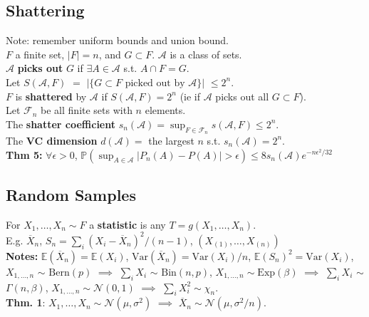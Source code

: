 \documentclass[10pt,twocolumn]{article}
\begin{document}
\subsection*{Shattering}
Note: remember uniform bounds and union bound.\\
$F$ a finite set, $|F| = n$, and $G \subset F$. $\mathcal{A}$ is a class of sets.\\
$\mathcal{A}$ \textbf{picks out} $G$ if $\exists A \in \mathcal{A}$ s.t. $A \cap F = G$.\\
Let $S(\mathcal{A},F)$ $=$ $|\{G \subset F \text{ picked out by } \mathcal{A}\}|$ $\leq 2^{n}$.\\
$F$ is \textbf{shattered} by $\mathcal{A}$ if $S(\mathcal{A},F) = 2^{n}$ (ie if $\mathcal{A}$ picks out all $G \subset F$).\\
Let $\mathcal{F}_{n}$ be all finite sets with $n$ elements.\\
The \textbf{shatter coefficient} $s_{n}(\mathcal{A}) = \sup_{F \in \mathcal{F}_{n}} s(\mathcal{A},F) \leq 2^{n}$.\\
The \textbf{VC dimension} $d(\mathcal{A}) =$ the largest $n$ s.t. $s_{n}(\mathcal{A}) = 2^{n}$.\\
\textbf{Thm 5:} $\forall \epsilon>0$, $\mathbb{P}(\sup_{A \in \mathcal{A}} |P_{n}(A) - P(A)| > \epsilon) \leq 8 s_{n}(\mathcal{A})e^{-n\epsilon^{2}/32}$


\subsection*{Random Samples}
For $X_{1},\ldots,X_{n} \sim F$ a \textbf{statistic} is any $T = g(X_{1},\ldots,X_{n})$.\\
E.g. $\overline{X}_{n}$, $S_{n} = \sum_{i}(X_{i}-\overline{X}_{n})^{2} / (n-1)$, $\left(X_{(1)},\ldots,X_{(n)}\right)$\\
\textbf{Notes:} $\mathbb{E}(\overline{X}_{n}) = \mathbb{E}(X_{i})$, $\text{Var}(\overline{X}_{n}) = \text{Var}(X_{i})/n$, $\mathbb{E}(S_{n})^{2} = \text{Var}(X_{i})$, $X_{1,\ldots,n}$ $\sim$ $\text{Bern}(p)$ $\implies$ $\sum_{i} X_{i}$ $\sim$ $\text{Bin}(n,p)$, $X_{1,\ldots,n} \sim \text{Exp}(\beta)$ $\implies$ $\sum_{i}X_{i}$ $\sim$ $\Gamma(n,\beta)$, $X_{1,\ldots,n} \sim \mathcal{N}(0,1)$ $\implies$ $\sum_{i}X_{i}^{2} \sim \chi_{n}$. \\
\textbf{Thm. 1}: $X_{1},\ldots,X_{n} \sim \mathcal{N}(\mu,\sigma^{2})$ $\implies$  $\overline{X}_{n} \sim \mathcal{N}(\mu, \sigma^{2}/n)$.
\end{document}
